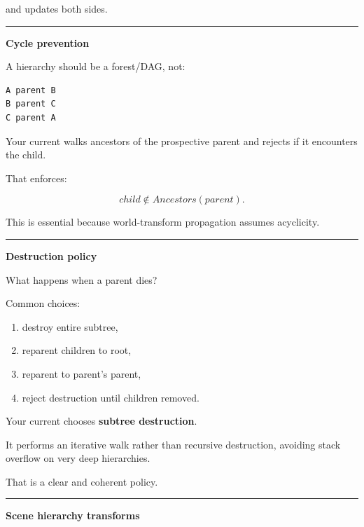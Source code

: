 and  updates both sides.

\begin{center}\rule{0.5\linewidth}{0.5pt}\end{center}

\textbf{Cycle prevention}

A hierarchy should be a forest/DAG, not:

\begin{verbatim}
A parent B
B parent C
C parent A
\end{verbatim}

Your current  walks ancestors of the prospective parent and rejects if it encounters the child.

That enforces:

\[
child\notin Ancestors(parent).
\]

This is essential because world-transform propagation assumes acyclicity.

\begin{center}\rule{0.5\linewidth}{0.5pt}\end{center}

\textbf{Destruction policy}

What happens when a parent dies?

Common choices:

\begin{enumerate}
\def\labelenumi{\arabic{enumi}.}
\tightlist
\item
  destroy entire subtree,
\item
  reparent children to root,
\item
  reparent to parent's parent,
\item
  reject destruction until children removed.
\end{enumerate}

Your current  chooses \textbf{subtree destruction}.

It performs an iterative walk rather than recursive destruction, avoiding stack overflow on very deep hierarchies.

That is a clear and coherent policy.

\begin{center}\rule{0.5\linewidth}{0.5pt}\end{center}

\textbf{Scene hierarchy transforms}

